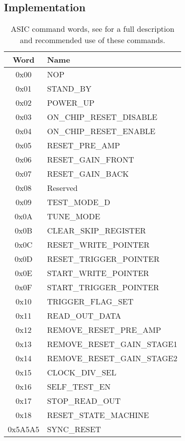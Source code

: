 \documentclass[]{article}
\begin{document}
  \subsection{Implementation} %
  \label{sub:tx_implementation}
  \begin{table}
    \begin{center}
      \setlength{\extrarowheight}{1.5pt}
      \begin{tabular}{c | l}
        Word & Name \\
        \hline  
        0x00 & NOP \\
        0x01 & STAND\_BY \\
        0x02 & POWER\_UP \\
        0x03 & ON\_CHIP\_RESET\_DISABLE \\
        0x04 & ON\_CHIP\_RESET\_ENABLE \\
        0x05 & RESET\_PRE\_AMP \\
        0x06 & RESET\_GAIN\_FRONT \\
        0x07 & RESET\_GAIN\_BACK \\
        0x08 & Reserved \\
        0x09 & TEST\_MODE\_D \\
        0x0A & TUNE\_MODE \\
        0x0B & CLEAR\_SKIP\_REGISTER \\
        0x0C & RESET\_WRITE\_POINTER \\
        0x0D & RESET\_TRIGGER\_POINTER \\
        0x0E & START\_WRITE\_POINTER \\
        0x0F & START\_TRIGGER\_POINTER \\
        0x10 & TRIGGER\_FLAG\_SET \\
        0x11 & READ\_OUT\_DATA \\
        0x12 & REMOVE\_RESET\_PRE\_AMP \\
        0x13 & REMOVE\_RESET\_GAIN\_STAGE1 \\
        0x14 & REMOVE\_RESET\_GAIN\_STAGE2 \\
        0x15 & CLOCK\_DIV\_SEL \\
        0x16 & SELF\_TEST\_EN \\
        0x17 & STOP\_READ\_OUT \\
        0x18 & RESET\_STATE\_MACHINE \\
        0x5A5A5 & SYNC\_RESET \\
      \end{tabular}
    \end{center}
    \caption{ASIC command words, see \cite{REF FOR LPD ASIC} for a full description and recommended use of these commands.}
    \label{tab:asic_command_words}
  \end{table}
\end{document}
